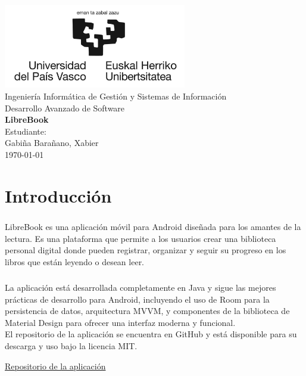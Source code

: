 \documentclass[a4paper,12pt]{report}
\begin{document}
  \begin{titlepage}
      \centering
      \includegraphics[width=0.6\textwidth]{./.img/logo.jpg}\\
      \vspace{1cm}
      \Large Ingeniería Informática de Gestión y Sistemas de Información\\
      \vspace{3cm}
      \Huge Desarrollo Avanzado de Software\\
      \vspace{0.5cm}
      \huge \textbf{LibreBook}\\
      \vspace{7.5cm}
      \Large Estudiante:\\
      \vspace{0.2cm}
      \large Gabiña Barañano, Xabier\\
      \vspace{1cm}
      \vfill
      \today
  \end{titlepage}
  \tableofcontents
  \listoffigures
  \chapter{Introducción}
    \paragraph*{}{
      LibreBook es una aplicación móvil para Android diseñada para los amantes de la lectura. Es una plataforma que permite a los usuarios crear una biblioteca personal digital donde pueden registrar, organizar y seguir su progreso en los libros que están leyendo o desean leer.
    }
    \paragraph*{}{
      La aplicación está desarrollada completamente en Java y sigue las mejores prácticas de desarrollo para Android, incluyendo el uso de Room para la persistencia de datos, arquitectura MVVM, y componentes de la biblioteca de Material Design para ofrecer una interfaz moderna y funcional.\\
      El repositorio de la aplicación se encuentra en GitHub y está disponible para su descarga y uso bajo la licencia MIT.
    }
    \begin{center}
        \color{blue}\href{https://github.com/Xabierland/DAS-Proyecto}{Repositorio de la aplicación}
    \end{center}
\end{document}
